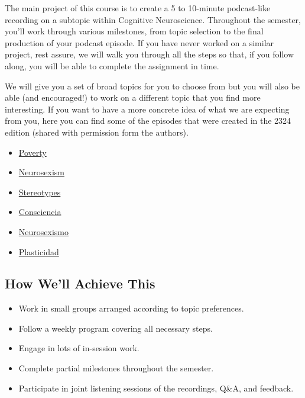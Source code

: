 \documentclass[
  letterpaper,
  DIV=11,
  numbers=noendperiod]{scrreprt}
\providecommand{\tightlist}{%
  \setlength{\itemsep}{0pt}\setlength{\parskip}{0pt}}\usepackage{longtable,booktabs,array}
\begin{document}
The main project of this course is to create a 5 to 10-minute
podcast-like recording on a subtopic within Cognitive Neuroscience.
Throughout the semester, you'll work through various milestones, from
topic selection to the final production of your podcast episode. If you
have never worked on a similar project, rest assure, we will walk you
through all the steps so that, if you follow along, you will be able to
complete the assignment in time.

We will give you a set of broad topics for you to choose from but you
will also be able (and encouraged!) to work on a different topic that
you find more interesting. If you want to have a more concrete idea of
what we are expecting from you, here you can find some of the episodes
that were created in the 2324 edition (shared with permission form the
authors).

\begin{itemize}
\tightlist
\item
  \href{_examples/Tue_11-12_Poverty.mp3}{Poverty}
\item
  \href{_examples/Tue_11-12_Neurosexism.mp3}{Neurosexism}
\item
  \href{_examples/Wed_12-13_Stereotypes-1.mp3}{Stereotypes}
\item
  \href{_examples/Wed_18-19_Consciencia-1.mp3}{Consciencia}
\item
  \href{_examples/Wed_18-19_Neurosexismo.mp3}{Neurosexismo}
\item
  \href{_examples/Wed_18-19_Plasticidad-1.mp3}{Plasticidad}
\end{itemize}

\subsection{How We'll Achieve This}\label{how-well-achieve-this}

\begin{itemize}
\tightlist
\item
  Work in small groups arranged according to topic preferences.
\item
  Follow a weekly program covering all necessary steps.
\item
  Engage in lots of in-session work.
\item
  Complete partial milestones throughout the semester.
\item
  Participate in joint listening sessions of the recordings, Q\&A, and
  feedback.
\end{itemize}
\end{document}

